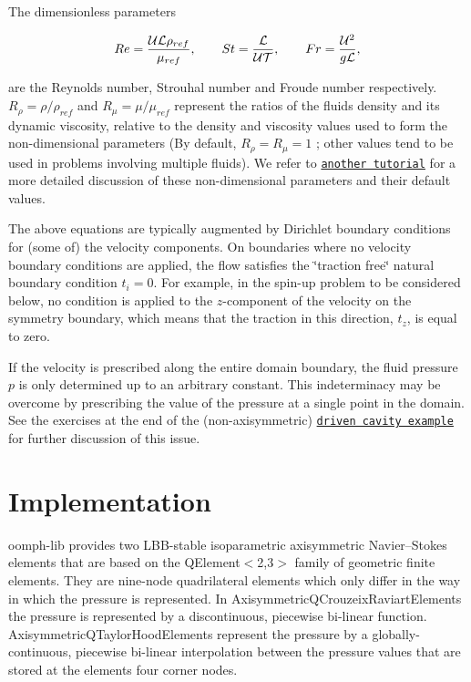 The dimensionless parameters \begin{center} \[ Re = \frac{{\cal U}{\cal L}\rho_{ref}}{\mu_{ref}}, \qquad St = \frac{{\cal L}}{{\cal U}{\cal T}}, \qquad Fr = \frac{{\cal U}^2}{g{\cal L}}, \] \end{center}  are the Reynolds number, Strouhal number and Froude number respectively. $ R_\rho=\rho/\rho_{ref} $ and $ R_\mu =\mu/\mu_{ref}$ represent the ratios of the fluid\textquotesingle{}s density and its dynamic viscosity, relative to the density and viscosity values used to form the non-\/dimensional parameters (By default, $ R_\rho = R_\mu = 1 $ ; other values tend to be used in problems involving multiple fluids). We refer to \href{../../../navier_stokes/driven_cavity/html/index.html#params}{\tt another tutorial} for a more detailed discussion of these non-\/dimensional parameters and their default values.

The above equations are typically augmented by Dirichlet boundary conditions for (some of) the velocity components. On boundaries where no velocity boundary conditions are applied, the flow satisfies the \char`\"{}traction free\char`\"{} natural boundary condition $ t_i = 0 $. For example, in the spin-\/up problem to be considered below, no condition is applied to the $ z $-\/component of the velocity on the symmetry boundary, which means that the traction in this direction, $ t_z $, is equal to zero.

If the velocity is prescribed along the entire domain boundary, the fluid pressure $ p $ is only determined up to an arbitrary constant. This indeterminacy may be overcome by prescribing the value of the pressure at a single point in the domain. See the exercises at the end of the (non-\/axisymmetric) \href{../../../navier_stokes/driven_cavity/html/index.html#exercises}{\tt driven cavity example} for further discussion of this issue.



 

\hypertarget{index_implementation}{}\section{Implementation}\label{index_implementation}
{\ttfamily oomph-\/lib} provides two L\+B\+B-\/stable isoparametric axisymmetric Navier--Stokes elements that are based on the {\ttfamily Q\+Element$<$2,3$>$} family of geometric finite elements. They are nine-\/node quadrilateral elements which only differ in the way in which the pressure is represented. In {\ttfamily Axisymmetric\+Q\+Crouzeix\+Raviart\+Elements} the pressure is represented by a discontinuous, piecewise bi-\/linear function. {\ttfamily Axisymmetric\+Q\+Taylor\+Hood\+Elements} represent the pressure by a globally-\/continuous, piecewise bi-\/linear interpolation between the pressure values that are stored at the elements\textquotesingle{} four corner nodes.

